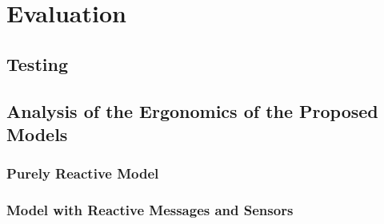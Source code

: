 
\chapter{Evaluation}
\label{chap:evaluation}

\section{Testing}

\section{Analysis of the Ergonomics of the Proposed Models}



\subsection{Purely Reactive Model}



\subsection{Model with Reactive Messages and Sensors}


